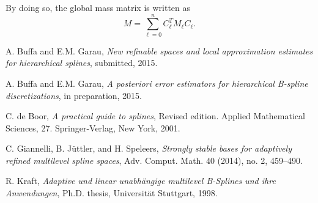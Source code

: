 \documentclass[12pt,a4paper,pdftex]{article}
\theoremstyle{plain}
\theoremstyle{definition}
\theoremstyle{remark}
\begin{document}
By doing so, the global mass matrix is written as
\begin{equation*}
M = \sum_{\ell = 0}^n C^T_\ell M_\ell C_\ell.
\end{equation*}

\begin{thebibliography}{1}
A. Buffa and E.M. Garau, \emph{New refinable spaces and local approximation estimates for hierarchical splines}, submitted, 2015.

A. Buffa and E.M. Garau, \emph{A posteriori error estimators for hierarchical B-spline discretizations}, in preparation, 2015.

% 
% 
% 

C. de Boor, \emph{A practical guide to splines}, Revised edition. Applied Mathematical Sciences, 27. Springer-Verlag, New York, 2001. 

C. Giannelli, B. J\"uttler, and H. Speleers, \emph{Strongly stable bases for adaptively refined multilevel spline spaces}, Adv. Comput. Math. 40 (2014), no. 2, 459--490.


R. Kraft, \emph{Adaptive und linear unabh\"angige multilevel B-Splines und ihre Anwendungen}, Ph.D. thesis, Universit\"at Stuttgart, 1998. 

% 
% 
% 


\end{thebibliography}
\end{document}
